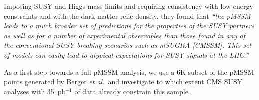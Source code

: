 Imposing SUSY and Higgs mass limits and requiring consistency with low-energy 
constraints and with the dark matter relic density, 
they found \cite{Berger:2008cq} that 
{\it ``the pMSSM leads to a much broader set of predictions for the properties 
of the SUSY partners as well as for a number of experimental observables than 
those found in any of the conventional SUSY breaking scenarios such as mSUGRA [CMSSM]. This set of models can easily lead to atypical expectations for SUSY signals 
at the LHC.''}

As a first step towards a full pMSSM analysis, we use a 6K subset of the 
pMSSM points generated by Berger {\it et al.}\ and investigate to which 
extent CMS SUSY analyses with 35~pb$^{-1}$ of data already constrain 
this sample. 
